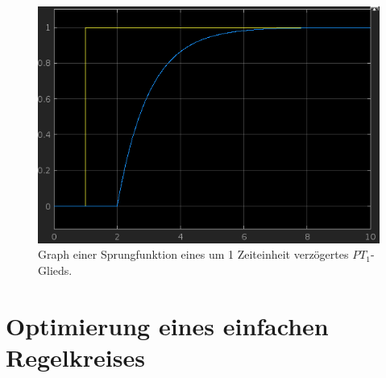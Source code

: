 \documentclass{article}
\begin{document}
			\subsubsection{}
				\begin{figure}[ht]
					\includegraphics[scale=0.4, center]{./Sprungfunktion_PT_1_Glied_verzoegert.png}
					\caption{Graph einer Sprungfunktion eines um 1 Zeiteinheit verzögertes $PT_1$-Glieds.}
					\label{fig1: Springfunktion-PT-1-Glied}
				\end{figure}	
\newpage
	\section{Optimierung eines einfachen Regelkreises}
	
\end{document}
